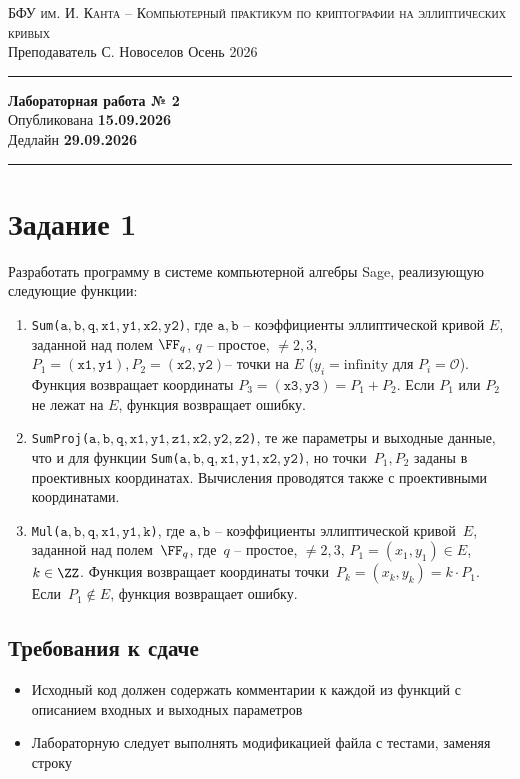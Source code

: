 \documentclass[11pt]{exam}
\theoremstyle{definition}
\begin{document}
	
	{\noindent
		\textsc{БФУ им. И. Канта -- Компьютерный практикум по криптографии на эллиптических кривых }\\[5pt]
		Преподаватель {С. Новоселов}   \hfill{Осень 2026\\}
	\hrule
	\begin{center}
		{\LARGE\textbf{
				Лабораторная работа № 2 \\[5pt]
		}}
			Опубликована \textbf{15.09.2026} \\[5pt] 
			Дедлайн \textbf{29.09.2026}
		
	\end{center}
	\hrule \vspace{5mm}
	
	\thispagestyle{empty}
	
	\section*{Задание 1}
	
	Разработать программу в системе компьютерной алгебры Sage, реализующую следующие функции:
	
	\begin{enumerate}
		\item \texttt{Sum($\mathtt{a, b, q,  x1, y1, x2, y2}$)}, где $\mathtt{a, b}$ -- коэффициенты эллиптической кривой $E$, заданной над полем $\FF_q$, $q$ -- простое, $\neq 2,3$, $P_1 = \mathtt{(x1, y1)}, P_2 = \mathtt{(x2, y2)}$-- точки на $E$ ($y_i  = \text{infinity}$ для $P_i = \mathcal{O}$). Функция возвращает координаты $P_3 = \mathtt{(x3, y3)}= P_1 + P_2$. Если $P_1$ или $P_2$ не лежат на $E$, функция возвращает ошибку.
		
		\item \texttt{SumProj($\mathtt{a, b, q,  x1, y1, z1, x2, y2, z2}$)}, те же параметры и выходные данные, что и для функции \texttt{Sum($\mathtt{a, b, q,  x1, y1, x2, y2}$)}, но точки~$P_1, P_2 $ заданы в проективных координатах. Вычисления проводятся  также с проективными координатами.
		
		\item \texttt{Mul($\mathtt{a, b, q,  x1, y1, k}$)}, где $\mathtt{a, b}$ -- коэффициенты эллиптической кривой~$E$, заданной над полем~$\FF_q$, где~$q$ -- простое, $\neq 2,3$, $P_1 = (x_1, y_1) \in E$, $k \in \ZZ$. Функция возвращает координаты точки~$P_k = (x_k, y_k) = k \cdot P_1$. Если~$P_1 \notin E$, функция возвращает ошибку.
	\end{enumerate}

	\subsection*{Требования к сдаче}
    \begin{itemize}
        \item Исходный код должен содержать комментарии к каждой из функций с описанием входных и выходных параметров
        \item Лабораторную следует выполнять модификацией файла с тестами, заменяя строку
        

\end{itemize}}
\end{document}
